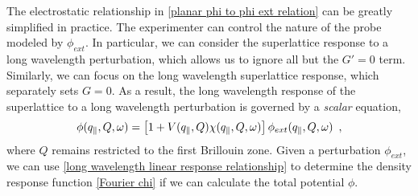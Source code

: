The electrostatic relationship in \eqref{planar phi to phi ext relation} can be greatly simplified in practice.  The experimenter can control the nature of the probe modeled by $\phi_{ext}$.  In particular, we can consider the superlattice response to a long wavelength perturbation, which allows us to ignore all but the $G'=0$ term.  Similarly, we can focus on the long wavelength superlattice response, which separately sets $G=0$.  As a result, the long wavelength response of the superlattice to a long wavelength perturbation is governed by a {\it scalar} equation,
\begin{equation}
    \label{long wavelength linear response relationship}
    \phi(q_\parallel, Q, \omega) 
    =
    \left[
    1
    +
    V(q_\parallel, Q)
    \chi(q_\parallel, Q, \omega)
    \right]
    \phi_{ext}(q_\parallel, Q, \omega)
    \,\,\,,
\end{equation}
where $Q$ remains restricted to the first Brillouin zone.  Given a perturbation $\phi_{ext}$, we can use \eqref{long wavelength linear response relationship} to determine the density response function \eqref{Fourier chi} if we can calculate the total potential $\phi$.